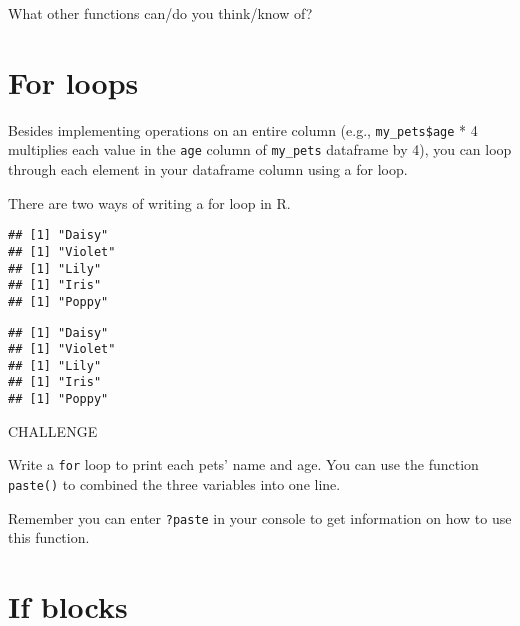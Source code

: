 \documentclass[]{book}
\newenvironment{Shaded}{\begin{snugshade}}{\end{snugshade}}
\newcommand{\ControlFlowTok}[1]{\textcolor[rgb]{0.13,0.29,0.53}{\textbf{#1}}}
\newcommand{\DecValTok}[1]{\textcolor[rgb]{0.00,0.00,0.81}{#1}}
\newcommand{\KeywordTok}[1]{\textcolor[rgb]{0.13,0.29,0.53}{\textbf{#1}}}
\newcommand{\NormalTok}[1]{#1}
\newcommand{\OperatorTok}[1]{\textcolor[rgb]{0.81,0.36,0.00}{\textbf{#1}}}
\begin{document}
What other functions can/do you think/know of?

\hypertarget{for-loops}{%
\section{For loops}\label{for-loops}}

Besides implementing operations on an entire column (e.g., \texttt{my\_pets\$age} * 4 multiplies each value in the \texttt{age} column of \texttt{my\_pets} dataframe by 4), you can loop through each element in your dataframe column using a for loop.

There are two ways of writing a for loop in R.

\begin{Shaded}
\end{Shaded}

\begin{verbatim}
## [1] "Daisy"
## [1] "Violet"
## [1] "Lily"
## [1] "Iris"
## [1] "Poppy"
\end{verbatim}

\begin{Shaded}
\end{Shaded}

\begin{verbatim}
## [1] "Daisy"
## [1] "Violet"
## [1] "Lily"
## [1] "Iris"
## [1] "Poppy"
\end{verbatim}

\leavevmode\hypertarget{challenge}{}%
CHALLENGE

Write a \texttt{for} loop to print each pets' name and age. You can use the function \texttt{paste()} to combined the three variables into one line.

Remember you can enter \texttt{?paste} in your console to get information on how to use this function.

\hypertarget{if-blocks}{%
\section{If blocks}\label{if-blocks}}
\end{document}
